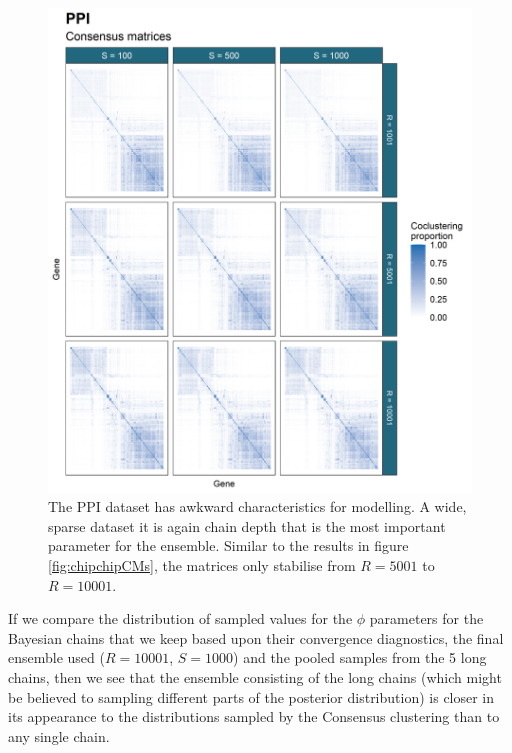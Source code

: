 \documentclass[]{article}
\begin{document}
\begin{figure}
	\centering
	\includegraphics[scale=0.8]{../Images/Yeast/PPICMcomparison.png}
	\caption{The PPI dataset has awkward characteristics for modelling. A wide, sparse dataset it is again chain depth that is the most important parameter for the ensemble. Similar to the results in figure \ref{fig:chipchipCMs}, the matrices only stabilise from $R=5001$ to $R=10001$.}
	\label{fig:ppiCMs}
\end{figure}

If we compare the distribution of sampled values for the $\phi$ parameters for the Bayesian chains that we keep based upon their convergence diagnostics, the final ensemble used ($R=10001$, $S=1000$) and the pooled samples from the 5 long chains, then we see that the ensemble consisting of the long chains (which might be believed to sampling different parts of the posterior distribution) is closer in its appearance to the distributions sampled by the Consensus clustering than to any single chain.
\end{document}
